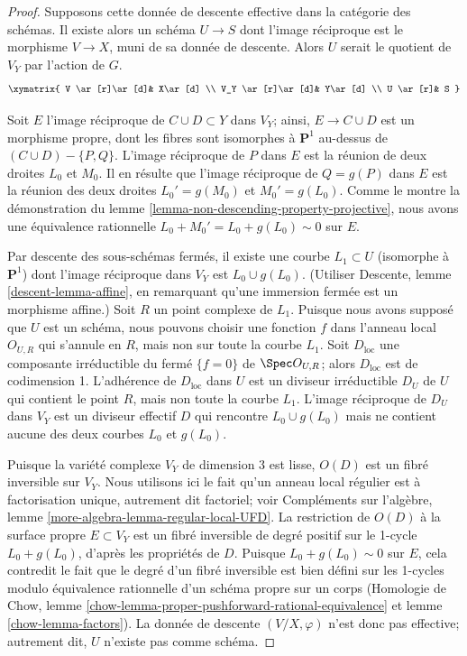 \begin{proof}
\medskip\noindent
Supposons cette donnée de descente effective dans la catégorie
des schémas. Il existe alors un schéma $U\to S$
dont l'image réciproque est le morphisme $V\to X$, muni
de sa donnée de descente. Alors $U$ serait le quotient
de $V_Y$ par l'action de $G$.
$$
\xymatrix{
V \ar[r]\ar[d]&  X\ar[d] \\
V_Y \ar[r]\ar[d]& Y\ar[d] \\
U \ar[r]& S
}
$$

\medskip\noindent
Soit $E$ l'image réciproque de $C\cup D\subset Y$ dans $V_Y$;
ainsi, $E\rightarrow C\cup D$ est un morphisme propre, dont les fibres
sont isomorphes à ${\mathbf P}^1$ au-dessus de $(C\cup D)-\{P,Q\}$.
L'image réciproque de $P$ dans $E$ est la réunion de deux droites $L_0$
et $M_0$. Il en résulte que l'image réciproque de $Q=g(P)$ dans $E$
est la réunion des deux droites $L_0'=g(M_0)$ et $M_0'=g(L_0)$.
Comme le montre la démonstration
du lemme \ref{lemma-non-descending-property-projective},
nous avons une équivalence rationnelle $L_0+M_0'=L_0+g(L_0)\sim 0$ sur $E$.

\medskip\noindent
Par descente des sous-schémas fermés, il existe une courbe $L_1\subset U$
(isomorphe à ${\mathbf P}^1$)
dont l'image réciproque dans $V_Y$ est $L_0\cup g(L_0)$. (Utiliser Descente, lemme
\ref{descent-lemma-affine}, en remarquant qu'une immersion fermée est un morphisme
affine.)
Soit $R$ un point complexe de $L_1$. Puisque
nous avons supposé que $U$ est un schéma, nous pouvons choisir une fonction
$f$ dans l'anneau local $O_{U,R}$ qui s'annule en $R$, mais non
sur toute la courbe $L_1$. Soit $D_{\text{loc}}$ une composante irréductible
du fermé $\{f = 0\}$ de $\Spec O_{U,R}$; alors
$D_{\text{loc}}$ est de codimension 1.
L'adhérence de $D_{\text{loc}}$ dans $U$ est un diviseur irréductible $D_U$
de $U$ qui contient le point $R$, mais non toute la courbe $L_1$.
L'image réciproque de $D_U$ dans $V_Y$ est un diviseur effectif $D$
qui rencontre $L_0\cup g(L_0)$ mais ne contient aucune des deux
courbes $L_0$ et $g(L_0)$.

\medskip\noindent
Puisque la variété complexe $V_Y$ de dimension 3 est lisse, $O(D)$ est un fibré
inversible sur $V_Y$. Nous utilisons ici le fait qu'un anneau local régulier est à factorisation unique,
autrement dit factoriel; voir
Compléments sur l'algèbre, lemme \ref{more-algebra-lemma-regular-local-UFD}.
La restriction de $O(D)$ à la surface propre
$E\subset V_Y$ est un fibré inversible de degré positif sur le 1-cycle
$L_0+g(L_0)$, d'après les propriétés de $D$. Puisque
$L_0+g(L_0)\sim 0$ sur $E$, cela contredit
le fait que le degré d'un fibré inversible est bien défini
sur les 1-cycles modulo équivalence rationnelle d'un schéma propre
sur un corps (Homologie de Chow,
lemme \ref{chow-lemma-proper-pushforward-rational-equivalence}
et lemme \ref{chow-lemma-factors}). La donnée de descente
$(V/X,\varphi)$ n'est donc pas effective; autrement dit, $U$ n'existe pas
comme schéma.
\end{proof}

